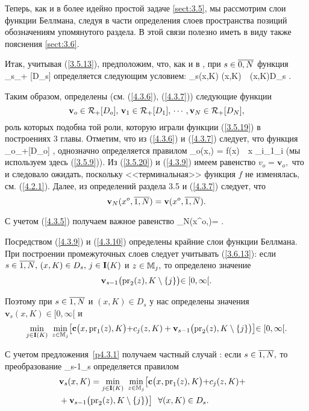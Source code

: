 Теперь, как и в более идейно простой задаче \ref{sect:3.5},
мы рассмотрим слои функции Беллмана,
следуя в части определения слоев пространства
позиций обозначениям упомянутого  раздела.
В этой связи полезно иметь
в виду также пояснения \ref{sect:3.6}.

Итак, учитывая (\ref{3.5.13}),
предположим, что, как и в
\cite[(6.12)]{Cha3`},
при
$s\in \ov{0,N}$ функция
\bfn
  \label{4.3.6`}
  _s\in \car_+ [D_s]
\efn
определяется следующим условием:
\bfn
  \label{4.3.7}
  _s(x,K) \df {}(x,K)\ \ \fa (x,K)\in D_s
  .
\efn

Таким образом, определены
(см. (\ref{4.3.6}), (\ref{4.3.7}))
следующие функции
$$
  \mathbf{v}_o\in \car_+[D_o],\,\mathbf{v}_1\in \car_+[D_1],\,\cdots,
  \mathbf{v}_N\in \car_+[D_N]
  ,
$$
роль которых подобна той роли,
которую играли функции (\ref{3.5.19})
в построениях 3 главы.
Отметим, что из (\ref{4.3.6}) и (\ref{4.3.7})
следует, что функция
\bfn
  \label{4.3.8}
  _o\in \car_+[D_o]
  ,
\efn
однозначно определяется правилом
\bfn
  \label{4.3.9}
  _o(x,\emp) = f(x)\ \ \fa x\in
  \bigcup\limits_{i\in{}\sm {}_1}_i
\efn
(мы используем здесь (\ref{3.5.9})).
Из (\ref{3.5.20}) и (\ref{4.3.9})
имеем равенство $v_o = \mathbf{v}_o,$
что и следовало ожидать,
поскольку <<терминальная>> функция $f$ не изменялась,
см. (\ref{4.2.1}).
Далее, из определений раздела 3.5 и (\ref{4.3.7})
следует, что
$$
  \mathbf{v}_N(x^o,\ov{1,N}) = \mathbf{v}(x^o,\ov{1,N})
  .
$$

С учетом (\ref{4.3.5}) получаем важное равенство
\bfn
  \label{4.3.10}
  _N(x^o,)= 
  .
\efn

Посредством (\ref{4.3.9}) и (\ref{4.3.10})
определены крайние слои функции Беллмана.
При построении
промежуточных слоев следует учитывать (\ref{3.6.13}):
если
$s\in\ov{1,N},\, (x,K)\in D_s,\,j\in \mathbf{I}(K)$ и
$z\in {\mathbb M}_j,$
то определено значение
$$
  \mathbf{v}_{s-1}\bigl(\mathrm{pr}_2(z),K\setminus\{j\}\bigl)\in [0,\infty[
  .
$$

Поэтому при
$s\in\ov{1,N}$ и $(x,K)\in D_s$
у нас определены значения
$\mathbf{v}_s(x,K)\in [0,\infty[$ и
$$
  \min\limits_{j\in \mathbf{I}(K)}\ \min\limits_{z\in\bbm_j}
  \bigl[\mathbf{c}\bigl(x,\mathrm{pr}_1(z),K\bigl) +
  c_j(z,K) + \mathbf{v}_{s-1}\bigl(\mathrm{pr}_2(z),K\sm\{j\}\bigl)
  \bigl]\in [0,\infty[
  .
$$

С учетом предложения~\ref{p4.3.1}
получаем частный случай \cite[предложение~6.1]{Cha3`}:
если $s\in\ov{1,N},$
то преобразование
\bfn
  \label{4.3.11}
  _{s-1}\longrightarrow {}_s
\efn
определяется правилом
\begin{eqnarray}
  &\mathbf{v}_s(x,K) =  \min\limits_{j\in \mathbf{I}(K)}\
  \min\limits_{z\in\bbm_j}\bigl[\mathbf{c}\bigl(x,\mathrm{pr}_1(z),K\bigl) +
  c_j(z,K) +
  &\nonumber\\
  &+\mathbf{v}_{s-1}\bigl(\mathrm{pr}_2(z),K\sm\{j\}\bigl)\bigl]\ \
  \fa (x,K)\in  D_s
  .
  \label{4.3.12}
\end{eqnarray}

